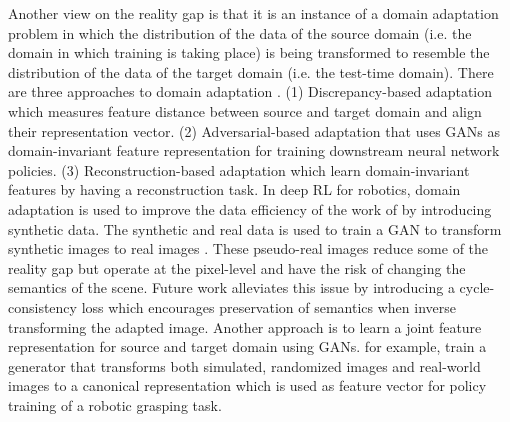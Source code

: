 \documentclass[\home/main.tex]{subfiles}
\begin{document}
Another view on the reality gap is that it is an instance of a domain adaptation problem in which the distribution of the data of the source domain (i.e. the domain in which training is taking place) is being transformed to resemble the distribution of the data of the target domain (i.e. the test-time domain). There are three approaches to domain adaptation \autocite{Zhao2020}. (1) Discrepancy-based adaptation which measures feature distance between source and target domain and align their representation vector. (2) Adversarial-based adaptation that uses \glspl{GAN} as domain-invariant feature representation for training downstream neural network policies. (3) Reconstruction-based adaptation which learn domain-invariant features by having a reconstruction task.
In deep RL for robotics, domain adaptation is used to improve the data efficiency of the work of \autocite{Levine2016} by introducing synthetic data. The synthetic and real data is used to train a \gls{GAN} to transform synthetic images to real images \autocite{bousmalis2018using}. These pseudo-real images reduce some of the reality gap but operate at the pixel-level and have the risk of changing the semantics of the scene. Future work \autocite{rao2020rl} alleviates this issue by introducing a cycle-consistency loss which encourages preservation of semantics when inverse transforming the adapted image. Another approach is to learn a joint feature representation for source and target domain using \glspl{GAN}.\Textcite{james2019sim} for example, train a generator that transforms both simulated, randomized images and real-world images to a canonical representation which is used as feature vector for policy training of a robotic grasping task. 
\end{document}
